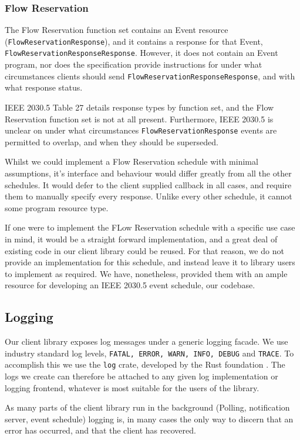 \subsubsection{Flow Reservation}
The Flow Reservation function set contains an Event resource (\texttt{FlowReservationResponse}), and it contains a response for that Event, \texttt{FlowReservationResponseResponse}. However, it does not contain an Event program, nor does the specification provide instructions for under what circumstances clients should send \texttt{FlowReservationResponseResponse}, and with what response status.

IEEE 2030.5 Table 27 details response types by function set, and the Flow Reservation function set is not at all present. Furthermore, IEEE 2030.5 is unclear on under what circumstances \texttt{FlowReservationResponse} events are permitted to overlap, and when they should be superseded. 

Whilst we could implement a Flow Reservation schedule with minimal assumptions, it's interface and behaviour would differ greatly from all the other schedules. It would defer to the client supplied callback in all cases, and require them to manually specify every response. Unlike every other schedule, it cannot some program resource type.

If one were to implement the FLow Reservation schedule with a specific use case in mind, it would be a straight forward implementation, and a great deal of existing code in our client library could be reused. For that reason, we do not provide an implementation for this schedule, and instead leave it to library users to implement as required. We have, nonetheless, provided them with an ample resource for developing an IEEE 2030.5 event schedule, our codebase.

\subsection{Logging}
Our client library exposes log messages under a generic logging facade. We use industry standard log levels, \texttt{FATAL, ERROR, WARN, INFO, DEBUG} and \texttt{TRACE}. To accomplish this we use the \texttt{log} crate, developed by the Rust foundation \cite{logcrate}. The logs we create can therefore be attached to any given log implementation or logging frontend, whatever is most suitable for the users of the library.

As many parts of the client library run in the background (Polling, notification server, event schedule) logging is, in many cases the only way to discern that an error has occurred, and that the client has recovered. 

